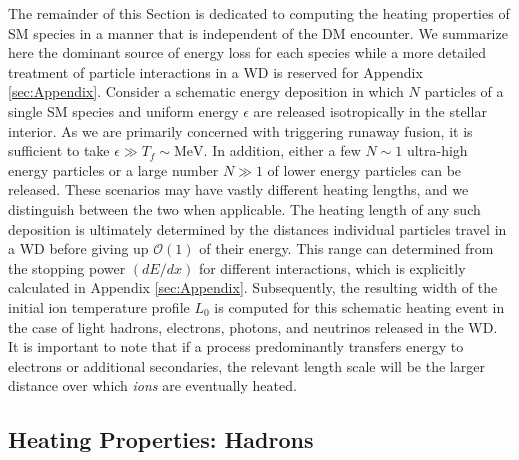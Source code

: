 \documentclass[twocolumn,preprintnumbers,amsmath,amssymb,prl, superscriptaddress]{revtex4}
\newcommand{\OO}{\mathcal{O}}
\begin{document}
The remainder of this Section is dedicated to computing the heating properties of SM species in a manner that is independent of the DM encounter.
We summarize here the dominant source of energy loss for each species while a more detailed treatment of particle interactions in a WD is reserved for Appendix \ref{sec:Appendix}.
Consider a schematic energy deposition in which $N$ particles of a single SM species and uniform energy $\epsilon$ are released isotropically in the stellar interior.
As we are primarily concerned with triggering runaway fusion, it is sufficient to take $\epsilon \gg T_f \sim \text{MeV}$.
In addition, either a few $N \sim 1$ ultra-high energy particles or a large number $N \gg 1$ of lower energy particles can be released.
These scenarios may have vastly different heating lengths, and we distinguish between the two when applicable.
The heating length of any such deposition is ultimately determined by the distances individual particles travel in a WD before giving up $\OO(1)$ of their energy.
This range can determined from the stopping power $(dE/dx)$ for different interactions, which is explicitly calculated in Appendix \ref{sec:Appendix}.
Subsequently, the resulting width of the initial ion temperature profile $L_0$ is computed for this schematic heating event in the case of light hadrons, electrons, photons, and neutrinos released in the WD.
It is important to note that if a process predominantly transfers energy to electrons or additional secondaries, the relevant length scale will be the larger distance over which \emph{ions} are eventually heated.

\subsection{Heating Properties: Hadrons}
\end{document}

